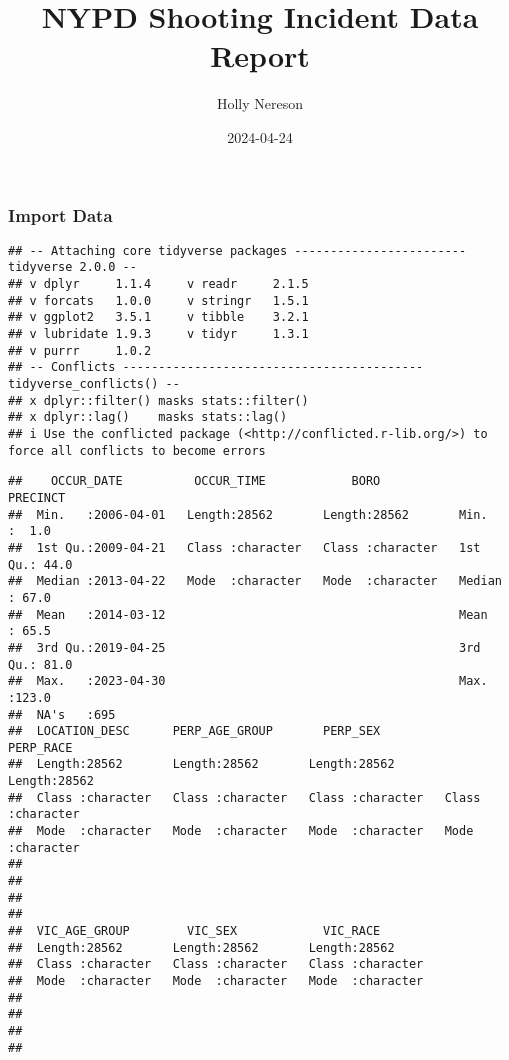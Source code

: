 \documentclass[
]{article}
\title{NYPD Shooting Incident Data Report}
\author{Holly Nereson}
\date{2024-04-24}
\begin{document}
\maketitle

\hypertarget{import-data}{%
\subsubsection{Import Data}\label{import-data}}

\begin{verbatim}
## -- Attaching core tidyverse packages ------------------------ tidyverse 2.0.0 --
## v dplyr     1.1.4     v readr     2.1.5
## v forcats   1.0.0     v stringr   1.5.1
## v ggplot2   3.5.1     v tibble    3.2.1
## v lubridate 1.9.3     v tidyr     1.3.1
## v purrr     1.0.2     
## -- Conflicts ------------------------------------------ tidyverse_conflicts() --
## x dplyr::filter() masks stats::filter()
## x dplyr::lag()    masks stats::lag()
## i Use the conflicted package (<http://conflicted.r-lib.org/>) to force all conflicts to become errors
\end{verbatim}

\begin{verbatim}
##    OCCUR_DATE          OCCUR_TIME            BORO              PRECINCT    
##  Min.   :2006-04-01   Length:28562       Length:28562       Min.   :  1.0  
##  1st Qu.:2009-04-21   Class :character   Class :character   1st Qu.: 44.0  
##  Median :2013-04-22   Mode  :character   Mode  :character   Median : 67.0  
##  Mean   :2014-03-12                                         Mean   : 65.5  
##  3rd Qu.:2019-04-25                                         3rd Qu.: 81.0  
##  Max.   :2023-04-30                                         Max.   :123.0  
##  NA's   :695                                                               
##  LOCATION_DESC      PERP_AGE_GROUP       PERP_SEX          PERP_RACE        
##  Length:28562       Length:28562       Length:28562       Length:28562      
##  Class :character   Class :character   Class :character   Class :character  
##  Mode  :character   Mode  :character   Mode  :character   Mode  :character  
##                                                                             
##                                                                             
##                                                                             
##                                                                             
##  VIC_AGE_GROUP        VIC_SEX            VIC_RACE        
##  Length:28562       Length:28562       Length:28562      
##  Class :character   Class :character   Class :character  
##  Mode  :character   Mode  :character   Mode  :character  
##                                                          
##                                                          
##                                                          
## 
\end{verbatim}
\end{document}
